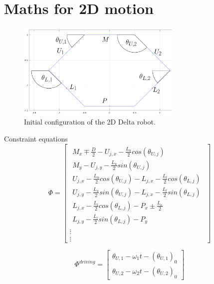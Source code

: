 \section{Maths for 2D motion}

\begin{figure}[h!]
	\centering
	\includegraphics[width=0.7\textwidth]{figures/Initial_2D.png}                                                              
	\caption[Initial configuration of the 2D Delta robot]{Initial configuration of the 2D Delta robot.}
	\label{fig:initia2D}
\end{figure}

Constraint equations
\begin{equation}
    \Phi=
    \begin{bmatrix}
    \begin{array}{l} %
    M_x\mp\frac{D}{2}-U_{j,x}-\frac{L_u}{2} cos(\theta_{U,j}) \\
    M_y-U_{j,y}-\frac{L_u}{2} sin(\theta_{U,j})\\
    U_{j,x}-\frac{L_u}{2}cos(\theta_{U,j})-L_{j,x}-\frac{L_l}{2}cos(\theta_{L,j}) \\
    U_{j,y}-\frac{L_u}{2}sin(\theta_{U,j})-L_{j,x}-\frac{L_l}{2}sin(\theta_{L,j})\\
    L_{j,x}-\frac{L_l}{2}cos(\theta_{L,j})-P_x \pm \frac{L_e}{2} \\
    L_{j,y}-\frac{L_l}{2}sin(\theta_{L,j})-P_y%
    \end{array}\\
    \vdots \\
    \vdots
    \end{bmatrix}
\end{equation}

\begin{equation}
    \Phi^{driving}=
    \begin{bmatrix}
    \theta_{U,1} - \omega_1 t - (\theta_{U,1})_0\\
    \theta_{U,2} - \omega_2 t - (\theta_{U,2})_0
    \end{bmatrix}
\end{equation}

